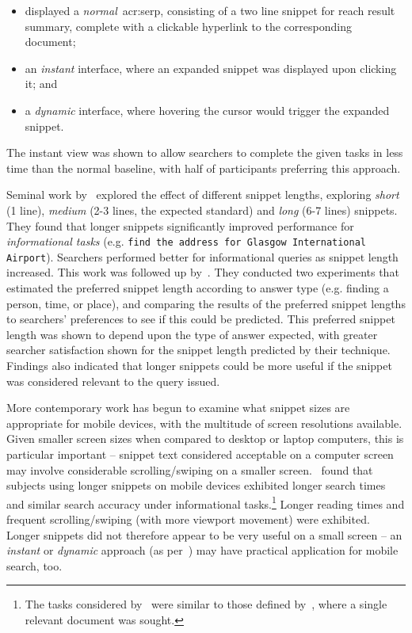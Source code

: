 \begin{itemize}
    \item{displayed a \emph{normal}~\gls{acr:serp}, consisting of a two line snippet for reach result summary, complete with a clickable hyperlink to the corresponding document;}
    \item{an \emph{instant} interface, where an expanded snippet was displayed upon clicking it; and}
    \item{a \emph{dynamic} interface, where hovering the cursor would trigger the expanded snippet.}
\end{itemize}

The instant view was shown to allow searchers to complete the given tasks in less time than the normal baseline, with half of participants preferring this approach.

Seminal work by~\cite{cutrell2007eye_tracking} explored the effect of different snippet lengths, exploring \emph{short} (1 line), \emph{medium} (2-3 lines, the expected standard) and \emph{long} (6-7 lines) snippets. They found that longer snippets significantly improved performance for \emph{informational tasks} (e.g. \texttt{find the address for Glasgow International Airport}). Searchers performed better for informational queries as snippet length increased. This work was followed up by~\cite{kaisser2008improving}. They conducted two experiments that estimated the preferred snippet length according to answer type (e.g. finding a person, time, or place), and comparing the results of the preferred snippet lengths to searchers' preferences to see if this could be predicted. This preferred snippet length was shown to depend upon the type of answer expected, with greater searcher satisfaction shown for the snippet length predicted by their technique. Findings also indicated that longer snippets could be more useful if the snippet was considered relevant to the query issued.

More contemporary work has begun to examine what snippet sizes are appropriate for mobile devices, with the multitude of screen resolutions available. Given smaller screen sizes when compared to desktop or laptop computers, this is particular important -- snippet text considered acceptable on a computer screen may involve considerable scrolling/swiping on a smaller screen.~\cite{kim2017mobile_search_snippets} found that subjects using longer snippets on mobile devices exhibited longer search times and similar search accuracy under informational tasks.\footnote{The tasks considered by~\cite{kim2017mobile_search_snippets} were similar to those defined by~\cite{cutrell2007eye_tracking}, where a single relevant document was sought.} Longer reading times and frequent scrolling/swiping (with more viewport movement) were exhibited. Longer snippets did not therefore appear to be very useful on a small screen -- an \emph{instant} or \emph{dynamic} approach (as per~\cite{paek2004wavelens}) may have practical application for mobile search, too.

